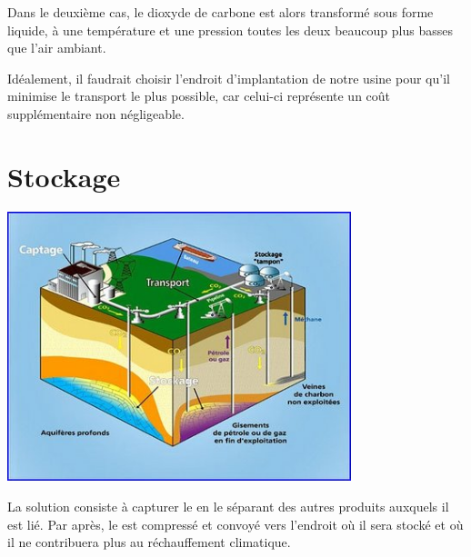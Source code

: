 \documentclass[a4, oneside, headings=normal]{scrartcl}
\begin{document}
Dans le deuxième cas, le dioxyde de carbone est alors transformé sous forme liquide, à une température et une pression toutes les deux beaucoup plus basses que l'air ambiant.
 

Idéalement, il faudrait choisir l'endroit d'implantation de notre usine pour qu'il minimise le transport le plus possible, car celui-ci représente un coût supplémentaire non négligeable.

\section{Stockage}

\begin{minipage}{0.5\textwidth}
\includegraphics[width=0.75\textwidth]{stockage.jpg}\cite{imstock}
\end{minipage}
\begin{minipage}{0.5\textwidth}
La solution consiste à capturer le  en le séparant des autres produits auxquels il est lié. Par après, le  est compressé et convoyé vers l'endroit où il sera stocké et où il ne contribuera plus au réchauffement climatique.
\end{minipage}
 
 
\end{document}
